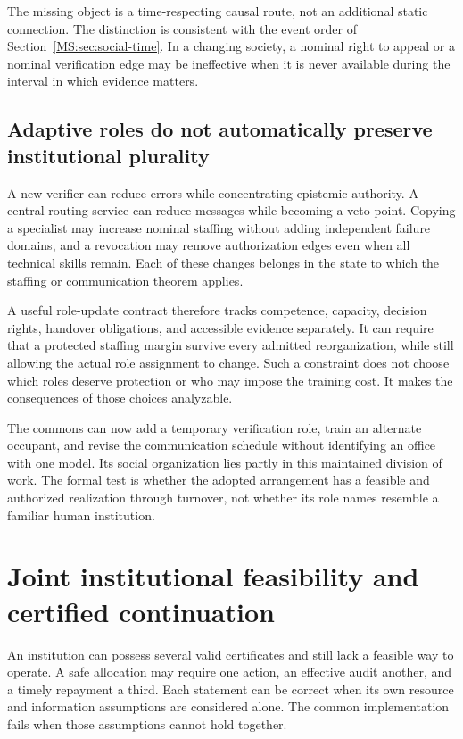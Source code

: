 The missing object is a time-respecting causal route, not an additional static connection. The distinction is consistent with the event order of Section~\ref{MS:sec:social-time}. In a changing society, a nominal right to appeal or a nominal verification edge may be ineffective when it is never available during the interval in which evidence matters.

\subsection{Adaptive roles do not automatically preserve institutional plurality}
A new verifier can reduce errors while concentrating epistemic authority. A central routing service can reduce messages while becoming a veto point. Copying a specialist may increase nominal staffing without adding independent failure domains, and a revocation may remove authorization edges even when all technical skills remain. Each of these changes belongs in the state to which the staffing or communication theorem applies.

A useful role-update contract therefore tracks competence, capacity, decision rights, handover obligations, and accessible evidence separately. It can require that a protected staffing margin survive every admitted reorganization, while still allowing the actual role assignment to change. Such a constraint does not choose which roles deserve protection or who may impose the training cost. It makes the consequences of those choices analyzable.

The commons can now add a temporary verification role, train an alternate occupant, and revise the communication schedule without identifying an office with one model. Its social organization lies partly in this maintained division of work. The formal test is whether the adopted arrangement has a feasible and authorized realization through turnover, not whether its role names resemble a familiar human institution.


\section{Joint institutional feasibility and certified continuation}\label{MS:sec:joint-synthesis}
An institution can possess several valid certificates and still lack a feasible way to operate. A safe allocation may require one action, an effective audit another, and a timely repayment a third. Each statement can be correct when its own resource and information assumptions are considered alone. The common implementation fails when those assumptions cannot hold together.


